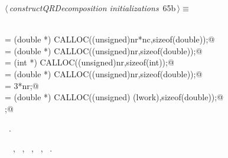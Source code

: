 \documentclass{article}
\begin{document}
\begin{flushleft} \small
\begin{minipage}{\linewidth}\label{scrap97}\raggedright\small
{} $\langle\,${\itshape constructQRDecomposition initializations}\nobreak\ {\footnotesize {65b}}$\,\rangle\equiv$
\vspace{-1ex}
\begin{list}{}{} \item
\mbox{}\verb@@\\
\mbox{}\verb@denseA = (double *) CALLOC((unsigned)nr*nc,sizeof(double));@\\
\mbox{}\verb@tau= (double *) CALLOC((unsigned)nr,sizeof(double));@\\
\mbox{}\verb@jpvt= (int *) CALLOC((unsigned)nr,sizeof(int));@\\
\mbox{}\verb@diag= (double *) CALLOC((unsigned)nr,sizeof(double));@\\
\mbox{}\verb@lwork = 3*nr;@\\
\mbox{}\verb@work = (double *) CALLOC((unsigned) (lwork),sizeof(double));@\\
\mbox{};@\\
\mbox{}\verb@@{\NWsep}
\end{list}
\vspace{-1.5ex}
\footnotesize
\begin{list}{}{\setlength{\itemsep}{-\parsep}\setlength{\itemindent}{-\leftmargin}}
\item \NWtxtMacroRefIn\ .
\item \NWtxtIdentsUsed\nobreak\  \verb@diag@\nobreak\ , \verb@lwork@\nobreak\ , \verb@nc@\nobreak\ , \verb@nr@\nobreak\ , \verb@work@\nobreak\ .
\item{}
\end{list}
\end{minipage}\vspace{4ex}
\end{flushleft}
\end{document}
